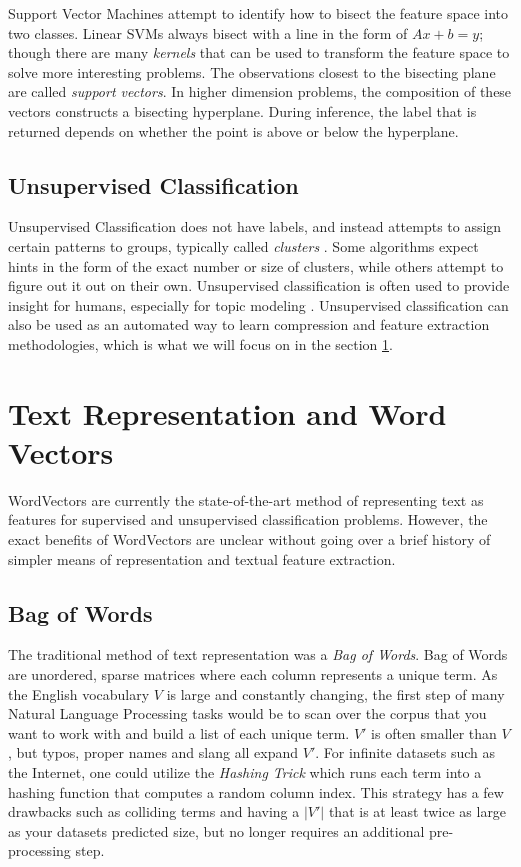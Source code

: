 Support Vector Machines attempt to identify how to bisect the feature space into two classes. Linear SVMs always bisect with a line in the form of $Ax + b = y$; though there are many \textit{kernels} that can be used to transform the feature space to solve more interesting problems. The observations closest to the bisecting plane are called \textit{support vectors}. In higher dimension problems, the composition of these vectors constructs a bisecting hyperplane. During inference, the label that is returned depends on whether the point is above or below the hyperplane.

\subsection{Unsupervised Classification}

Unsupervised Classification does not have labels, and instead attempts to assign certain patterns to groups, typically called \textit{clusters} \cite{celebi2015partitional}. Some algorithms expect hints in the form of the exact number or size of clusters, while others attempt to figure out it out on their own. Unsupervised classification is often used to provide insight for humans, especially for topic modeling \cite{celebi2015partitional}. Unsupervised classification can also be used as an automated way to learn compression and feature extraction methodologies, which is what we will focus on in the section \ref{sec:wordvectors}.  

\section{Text Representation and Word Vectors} \label{sec:wordvectors}

WordVectors \cite{word2vec} are currently the state-of-the-art method of representing text as features for supervised and unsupervised classification problems. However, the exact benefits of WordVectors are unclear without going over a brief history of simpler means of representation and textual feature extraction.

\subsection{Bag of Words}

\par{
The traditional method of text representation was a \textit{Bag of Words}. Bag of Words are unordered, sparse matrices where each column represents a unique term. As the English vocabulary $V$ is large and constantly changing, the first step of many Natural Language Processing tasks would be to scan over the corpus that you want to work with and build a list of each unique term. $V'$ is often smaller than $V$, but typos, proper names and slang all expand $V'$. For infinite datasets such as the Internet, one could utilize the \textit{Hashing Trick} \cite{weinberger2009feature} which runs each term into a hashing function that computes a random column index. This strategy has a few drawbacks such as colliding terms and having a $|V'|$ that is at least twice as large as your datasets predicted size, but no longer requires an additional pre-processing step.
}

